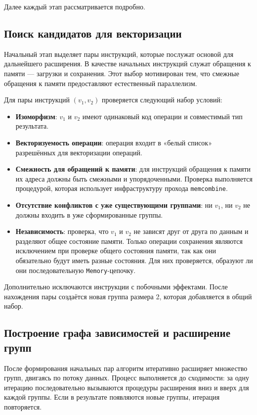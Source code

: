 Далее каждый этап рассматривается подробно.

\subsection{Поиск кандидатов для векторизации}
\label{sec:initial_pairs}

Начальный этап выделяет пары инструкций, которые послужат основой для дальнейшего расширения. 
В качестве начальных инструкций служат обращения к памяти --- загрузки и сохранения. 
Этот выбор мотивирован тем, что смежные обращения к памяти предоставляют естественный параллелизм.

Для пары инструкций \((v_1, v_2)\) проверяется следующий набор условий:

\begin{itemize}
    \item \textbf{Изоморфизм}: \(v_1\) и \(v_2\) имеют одинаковый код операции и совместимый тип результата.
    \item \textbf{Векторизуемость операции}: операция входит в «белый список» разрешённых для векторизации операций.
    \item \textbf{Смежность для обращений к памяти}: для инструкций обращения к памяти их адреса должны быть смежными и упорядоченными. Проверка выполняется процедурой, которая использует инфраструктуру прохода \texttt{memcombine}.
    \item \textbf{Отсутствие конфликтов с уже существующими группами}: ни \(v_1\), ни \(v_2\) не должны входить в уже сформированные группы.
    \item \textbf{Независимость}: проверка, что \(v_1\) и \(v_2\) не зависят друг от друга по данным и разделяют общее состояние памяти. 
    Только операции сохранения являются исключением при проверке общего состояния памяти, так как они обязательно будут иметь разные состояния. 
    Для них проверяется, образуют ли они последовательную \texttt{Memory}-цепочку.
\end{itemize}

Дополнительно исключаются инструкции с побочными эффектами. После нахождения пары создаётся новая группа размера 2, которая добавляется в общий набор.

\subsection{Построение графа зависимостей и расширение групп}
\label{sec:expansion}

После формирования начальных пар алгоритм итеративно расширяет множество групп, двигаясь по потоку данных. 
Процесс выполняется до сходимости: за одну итерацию последовательно вызываются процедуры расширения вниз и вверх для каждой группы. 
Если в результате появляются новые группы, итерация повторяется.

